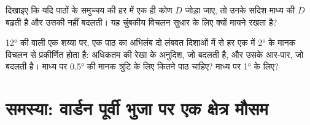 \begin{exercise}[$\star\star\star$]\label{exo:b1:field-lab-methods-1:11}
दिखाइए कि यदि पाठों के समुच्चय की हर  में एक ही कोण $D$ जोड़ा जाए, तो उनके सदिश माध्य की  $D$
बढ़ती है और उसकी  नहीं बदलती। यह चुंबकीय विचलन सुधार के लिए क्यों मायने रखता है?
\end{exercise}

\begin{exercise}[$\star\star\star$]\label{exo:b1:field-lab-methods-1:12}
\ang{12} की  वाली एक शय्या पर, एक पाठ का अभिलंब दो लंबवत दिशाओं में से हर एक में \ang{2} के मानक विचलन से
प्रकीर्णित होता है: अधिकतम  की रेखा के अनुदिश, जो  बदलती है, और उसके आर-पार, जो  बदलती है। माध्य
 पर \ang{0.5} की मानक त्रुटि के लिए कितने पाठ चाहिए? माध्य  पर \ang{1} के लिए?
\end{exercise}

\section{समस्या: वार्डन पूर्वी भुजा पर एक क्षेत्र मौसम}

